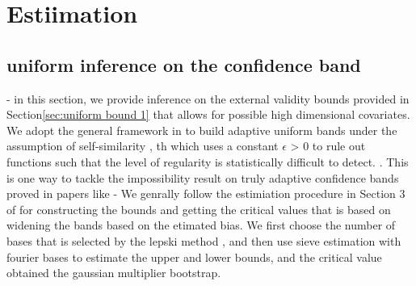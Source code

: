 \documentclass{article}
\begin{document}
\section{Estiimation}

\subsection{ uniform inference on the confidence band }-
in this section, we provide inference on the external validity bounds provided in Section\ref{sec:uniform bound 1} that allows for possible high dimensional covariates.  We adopt the general framework in \cite{chernozhukov honest} to build adaptive uniform bands under the assumption of self-similarity , th which uses a constant $\epsilon$ > 0 to rule out functions such that the level of regularity is statistically difficult to detect. \cite{picard tirbou, armstrong 2021} . This is one way to tackle the impossibility result on truly adaptive confidence bands proved in papers like \cite{low 1997} 
- We genrally follow the estimiation procedure in Section 3 of \cite{chernozhukov 2014} for constructing the bounds and getting the critical values that is based on widening the bands based on the etimated bias. We first choose  the number of bases that is selected by the lepski method , and then use sieve estimation with fourier bases  to estimate the upper and lower bounds, and the critical value obtained the gaussian multiplier bootstrap. 
\end{document}

